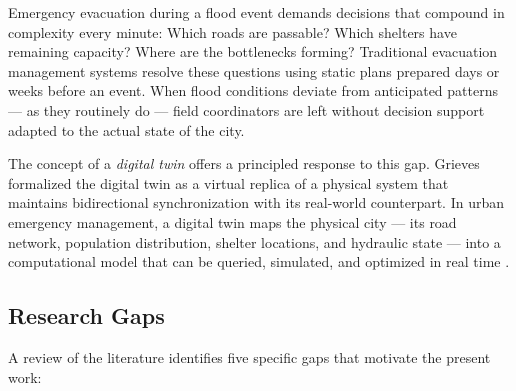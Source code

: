 \documentclass[journal]{IEEEtran}
\begin{document}
Emergency evacuation during a flood event demands decisions that compound in complexity every
minute: Which roads are passable? Which shelters have remaining capacity? Where are the
bottlenecks forming? Traditional evacuation management systems resolve these questions using
static plans prepared days or weeks before an event. When flood conditions deviate from
anticipated patterns — as they routinely do — field coordinators are left without decision
support adapted to the actual state of the city.

The concept of a \textit{digital twin} offers a principled response to this gap.
Grieves~\cite{grieves2014} formalized the digital twin as a virtual replica of a physical
system that maintains bidirectional synchronization with its real-world counterpart. In urban
emergency management, a digital twin maps the physical city — its road network, population
distribution, shelter locations, and hydraulic state — into a computational model that can be
queried, simulated, and optimized in real time \cite{mandal2025cityscale, riaz2023climate,
zhou2024framework}.

\subsection{Research Gaps}

A review of the literature identifies five specific gaps that motivate the present work:
\end{document}
